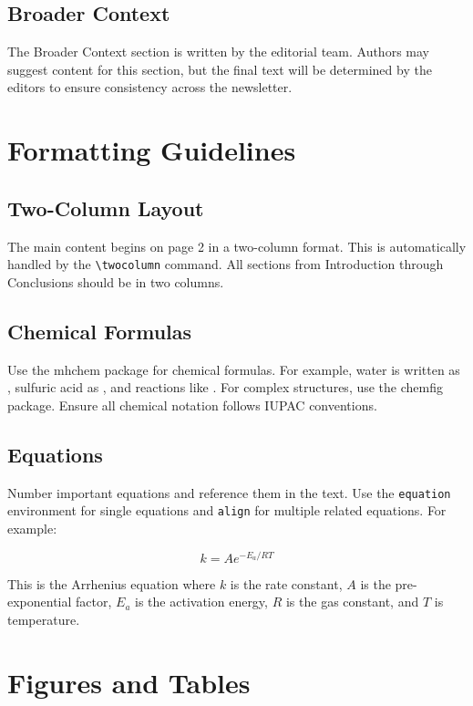 \documentclass[10pt, a4paper]{article}
\begin{document}
	\subsection{Broader Context} The Broader Context section is written by the editorial team. Authors may suggest content for this section, but the final text will be determined by the editors to ensure consistency across the newsletter.
	
	\section{Formatting Guidelines}
	
	\subsection{Two-Column Layout} The main content begins on page 2 in a two-column format. This is automatically handled by the \texttt{\textbackslash twocolumn} command. All sections from Introduction through Conclusions should be in two columns.
	
	\subsection{Chemical Formulas} Use the mhchem package for chemical formulas. For example, water is written as , sulfuric acid as , and reactions like . For complex structures, use the chemfig package. Ensure all chemical notation follows IUPAC conventions.
	
	\subsection{Equations} Number important equations and reference them in the text. Use the \texttt{equation} environment for single equations and \texttt{align} for multiple related equations. For example:
	
	\begin{equation}
		k = A e^{-E_a/RT}
	\end{equation}
	
	This is the Arrhenius equation where $k$ is the rate constant, $A$ is the pre-exponential factor, $E_a$ is the activation energy, $R$ is the gas constant, and $T$ is temperature.
	
	\section{Figures and Tables}
	
\end{document}
